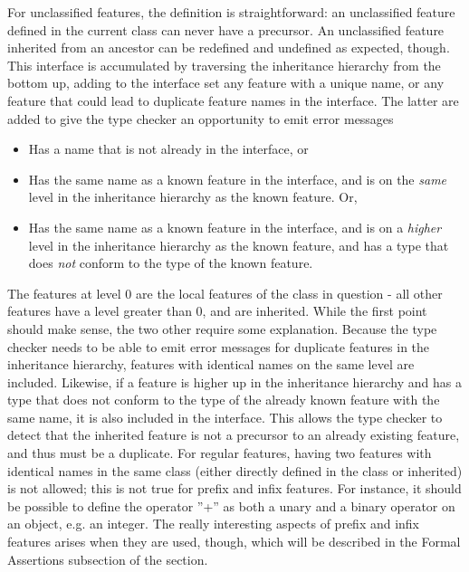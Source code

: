For unclassified features, the definition is straightforward: an unclassified feature defined in the current class can never have a precursor. An unclassified feature inherited from an ancestor can be redefined and undefined as expected, though.
 This interface is accumulated by traversing the inheritance hierarchy from the bottom up, adding to the interface set any feature with a unique name, or any feature that could lead to duplicate feature names in the interface. The latter are added to give the type checker an opportunity to emit error messages 
\begin{itemize}
\item Has a name that is not already in the interface, or
\item Has the same name as a known feature in the interface, and is on the \emph{same} level in the inheritance hierarchy as the known feature. Or,
\item Has the same name as a known feature in the interface, and is on a \emph{higher} level in the inheritance hierarchy as the known feature, and has a type that does \emph{not} conform to the type of the known feature.
\end{itemize}
The features at level 0 are the local features of the class in question - all other features have a level greater than 0, and are inherited. While the first point should make sense, the two other require some explanation. Because the type checker needs to be able to emit error messages for duplicate features in the inheritance hierarchy, features with identical names on the same level are included. Likewise, if a feature is higher up in the inheritance hierarchy and has a type that does not conform to the type of the already known feature with the same name, it is also included in the interface. This allows the type checker to detect that the inherited feature is not a precursor to an already existing feature, and thus must be a duplicate.
\cite{ostroff2001}
For regular features, having two features with identical names in the same class (either directly defined in the class or inherited) is not allowed; this is not true for prefix and infix features. For instance, it should be possible to define the operator ''+'' as both a unary and a binary operator on an object, e.g. an integer. The really interesting aspects of prefix and infix features arises when they are used, though, which will be described in the Formal Assertions subsection of the section.

